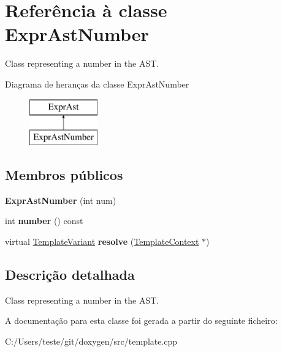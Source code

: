 \hypertarget{class_expr_ast_number}{\section{Referência à classe Expr\-Ast\-Number}
\label{class_expr_ast_number}
}


Class representing a number in the A\-S\-T.  


Diagrama de heranças da classe Expr\-Ast\-Number\begin{figure}[H]
\begin{center}
\leavevmode
\includegraphics[height=2.000000cm]{class_expr_ast_number}
\end{center}
\end{figure}
\subsection*{Membros públicos}
\begin{DoxyCompactItemize}
\item 
\hypertarget{class_expr_ast_number_af27c45e67ddafbac2d5722dc1c350166}{{\bfseries Expr\-Ast\-Number} (int num)}\label{class_expr_ast_number_af27c45e67ddafbac2d5722dc1c350166}

\item 
\hypertarget{class_expr_ast_number_a45ddffab98cef97adf64bf713afd1a12}{int {\bfseries number} () const }\label{class_expr_ast_number_a45ddffab98cef97adf64bf713afd1a12}

\item 
\hypertarget{class_expr_ast_number_af33b31cdb1179449bc274eec57c73f39}{virtual \hyperlink{class_template_variant}{Template\-Variant} {\bfseries resolve} (\hyperlink{class_template_context}{Template\-Context} $\ast$)}\label{class_expr_ast_number_af33b31cdb1179449bc274eec57c73f39}

\end{DoxyCompactItemize}


\subsection{Descrição detalhada}
Class representing a number in the A\-S\-T. 

A documentação para esta classe foi gerada a partir do seguinte ficheiro\-:\begin{DoxyCompactItemize}
\item 
C\-:/\-Users/teste/git/doxygen/src/template.\-cpp\end{DoxyCompactItemize}
